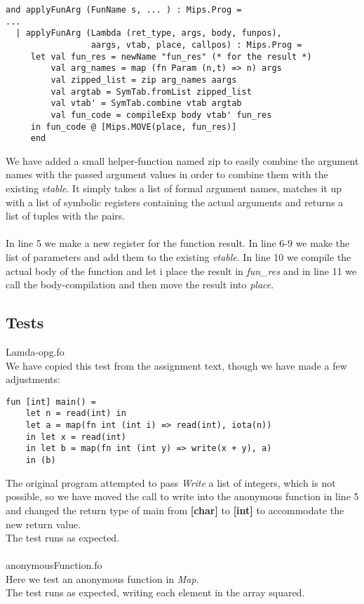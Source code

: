 \documentclass{article}
\begin{document}
\begin{lstlisting}
and applyFunArg (FunName s, ... ) : Mips.Prog =
...
  | applyFunArg (Lambda (ret_type, args, body, funpos),
                 aargs, vtab, place, callpos) : Mips.Prog =
     let val fun_res = newName "fun_res" (* for the result *)
         val arg_names = map (fn Param (n,t) => n) args
         val zipped_list = zip arg_names aargs
         val argtab = SymTab.fromList zipped_list
         val vtab' = SymTab.combine vtab argtab
         val fun_code = compileExp body vtab' fun_res            
     in fun_code @ [Mips.MOVE(place, fun_res)]
     end
\end{lstlisting}
\noindent We have added a small helper-function named zip to easily combine the argument names with the passed argument values in order to combine them with the existing \textit{vtable}. It simply takes a list of formal argument names, matches it up with a list of symbolic registers containing the actual arguments and returns a list of tuples with the pairs.\\
\\
\noindent In line 5 we make a new register for the function result. In line 6-9 we make the list of parameters and add them to the existing \textit{vtable}. In line 10 we compile the actual body of the function and let i place the result in \textit{fun\_res} and in line 11 we call the body-compilation and then move the result into \textit{place}.

\subsection{Tests}

Lamda-opg.fo\\
We have copied this test from the assignment text, though we have made a few adjustments:
\begin{lstlisting}
fun [int] main() = 
	let n = read(int) in 
	let a = map(fn int (int i) => read(int), iota(n)) 
	in let x = read(int) 
	in let b = map(fn int (int y) => write(x + y), a) 
	in (b)
\end{lstlisting}
\noindent The original program attempted to pass \textit{Write} a list of integers, which is not possible, so we have moved the call to write into the anonymous function in line 5 and changed the return type of main from \textbf{[char]} to \textbf{[int]} to accommodate the new return value.\\
The test runs as expected.\\
\\
anonymousFunction.fo\\
Here we test an anonymous function in \textit{Map}.\\
The test runs as expected, writing each element in the array squared.
\end{document}
